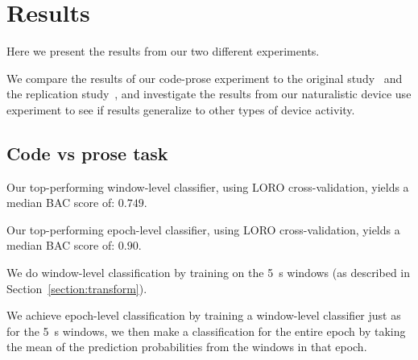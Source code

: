 \chapter{Results}\label{section:results}

    Here we present the results from our two different experiments.

    We compare the results of our code-prose experiment to the original study~\cite{floyd_decoding_2017} and the replication study~\cite{fucci_replication_2019}, and investigate the results from our naturalistic device use experiment to see if results generalize to other types of device activity.


    \section{Code vs prose task}

        Our top-performing window-level classifier, using LORO cross-validation, yields a median BAC score of: $0.749$.

        Our top-performing epoch-level classifier, using LORO cross-validation, yields a median BAC score of: $0.90$.

        We do window-level classification by training on the \SI{5}{\second} windows (as described in Section~\ref{section:transform}).

        We achieve epoch-level classification by training a window-level classifier just as for the \SI{5}{\second} windows, we then make a classification for the entire epoch by taking the mean of the prediction probabilities from the windows in that epoch.

        

